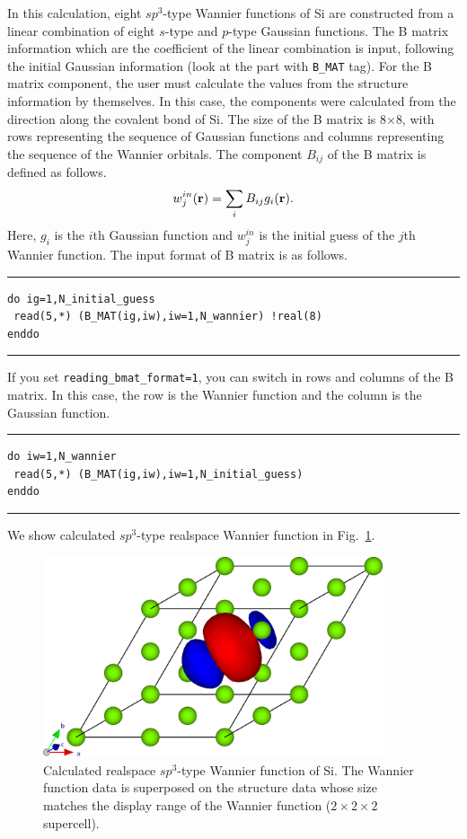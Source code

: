 \documentclass{article}
\begin{document}
In this calculation, eight $sp^3$-type Wannier functions of Si are constructed from a linear combination of eight $s$-type and $p$-type Gaussian functions. The B matrix information which are the coefficient of the linear combination is input, following the initial Gaussian information (look at the part with {\tt B\_MAT} tag). For the B matrix component, the user must calculate the values from the structure information by themselves. In this case, the components were calculated from the direction along the covalent bond of Si. The size of the B matrix is 8$\times$8, with rows representing the sequence of Gaussian functions and columns representing the sequence of the Wannier orbitals. The component $B_{ij}$ of the B matrix is defined as follows.
\begin{eqnarray}
w_{j}^{in}({\bf r})=\sum_{i}B_{ij} g_i({\bf r}). \nonumber 
\end{eqnarray} 
Here, $g_i$ is the $i$th Gaussian function and $w_{j}^{in}$ is the initial guess of the $j$th Wannier function. The input format of B matrix is as follows. 
\vspace{3mm}\hrule
\begin{verbatim}
do ig=1,N_initial_guess 
 read(5,*) (B_MAT(ig,iw),iw=1,N_wannier) !real(8)
enddo
\end{verbatim}
\hrule\vspace{3mm}
If you set \verb+reading_bmat_format=1+, you can switch in rows and columns of the B matrix. In this case, the row is the Wannier function and the column is the Gaussian function.
\vspace{3mm}\hrule
\begin{verbatim}
do iw=1,N_wannier
 read(5,*) (B_MAT(ig,iw),iw=1,N_initial_guess)
enddo
\end{verbatim}
\hrule\vspace{3mm}
We show calculated $sp^3$-type realspace Wannier function in Fig.~\ref{vesta-Si}.
\begin{figure}[H] 
\centering
\includegraphics[width=10cm]{dat.wan-realspace-Si.eps}
\caption{Calculated realspace $sp^3$-type Wannier function of Si. The Wannier function data is superposed on the structure data whose size matches the display range of the Wannier function ($2\times2\times2$ supercell).}
\label{vesta-Si}
\end{figure}
\end{document}
